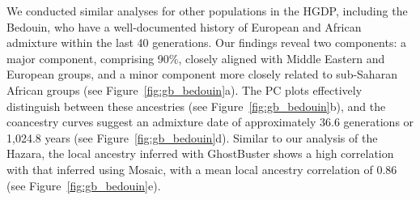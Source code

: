 We conducted similar analyses for other populations in the HGDP, including the Bedouin, who have a well-documented history of European and African admixture within the last 40 generations. Our findings reveal two components: a major component, comprising 90\%, closely aligned with Middle Eastern and European groups, and a minor component more closely related to sub-Saharan African groups (see Figure~\ref{fig:gb_bedouin}a). The PC plots effectively distinguish between these ancestries (see Figure~\ref{fig:gb_bedouin}b), and the coancestry curves suggest an admixture date of approximately 36.6 generations or 1,024.8 years (see Figure~\ref{fig:gb_bedouin}d). Similar to our analysis of the Hazara, the local ancestry inferred with GhostBuster shows a high correlation with that inferred using Mosaic, with a mean local ancestry correlation of 0.86 (see Figure~\ref{fig:gb_bedouin}e).

